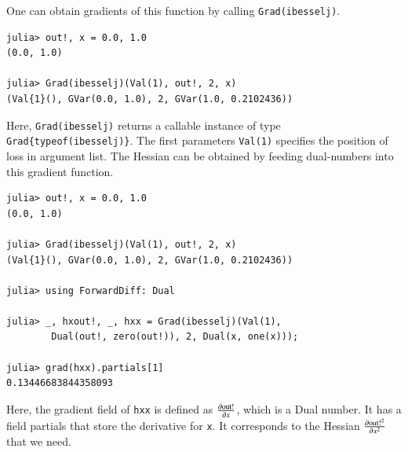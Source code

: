\documentclass{article}
\newcommand{\<}{\langle}
\renewcommand{\>}{\rangle}
\theoremstyle{definition}\newtheorem{definition}{\textit{Definition}}
\begin{document}
One can obtain gradients of this function by calling \texttt{Grad(ibesselj)}.

\begin{minipage}{.88\columnwidth}
\begin{lstlisting}
julia> out!, x = 0.0, 1.0
(0.0, 1.0)

julia> Grad(ibesselj)(Val(1), out!, 2, x)
(Val{1}(), GVar(0.0, 1.0), 2, GVar(1.0, 0.2102436))
\end{lstlisting}
\end{minipage}

Here, \texttt{Grad(ibesselj)} returns a callable instance of type \texttt{Grad\{typeof(ibesselj)\}}. The first parameters \texttt{Val(1)} specifies the position of loss in argument list. 
The Hessian can be obtained by feeding dual-numbers into this gradient function.

\begin{minipage}{.88\columnwidth}
\begin{lstlisting}
julia> out!, x = 0.0, 1.0
(0.0, 1.0)

julia> Grad(ibesselj)(Val(1), out!, 2, x)
(Val{1}(), GVar(0.0, 1.0), 2, GVar(1.0, 0.2102436))

julia> using ForwardDiff: Dual

julia> _, hxout!, _, hxx = Grad(ibesselj)(Val(1), 
        Dual(out!, zero(out!)), 2, Dual(x, one(x)));

julia> grad(hxx).partials[1]
0.13446683844358093
\end{lstlisting}
\end{minipage}

Here, the gradient field of \texttt{hxx} is defined as $\frac{\partial {\rm out!}}{\partial x}$, which is a Dual number.
It has a field partials that store the derivative for \texttt{x}.
It corresponds to the Hessian $\frac{\partial{\rm out!}^2}{\partial x^2}$ that we need.
\end{document}

